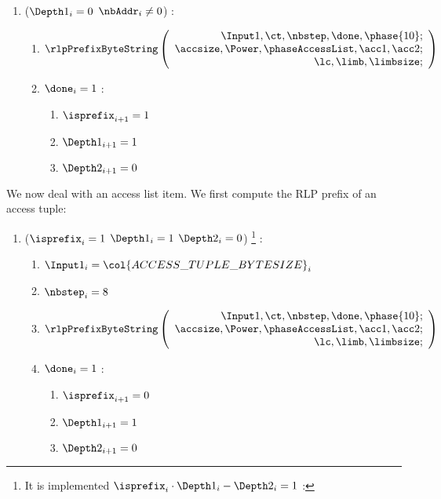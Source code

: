 \begin{enumerate}[resume]
	\item \If ($\Depth 1_{i}=0$ \et $\nbAddr_{i} \neq 0$) \Then:
	\begin{enumerate}
	    \item 
			\[
				\rlpPrefixByteString
				\left( \begin{array}{r}
					\Input1,
					\ct,
					\nbstep,
					\done,
					\phase{10}; \\
					\accsize,
					\Power,
					\phaseAccessList,
					\acc1,
					\acc2; \\
					\lc,
					\limb,
					\limbsize; \\
				\end{array} \right)
			\]
	     \item \If $\done_{i}=1$ \Then:
	     \begin{enumerate} 
		 	\item $\isprefix_{i+1}=1$
		 	\item $\Depth1_{i+1}=1$
		 	\item $\Depth2_{i+1}=0$	
	     \end{enumerate}
	\end{enumerate}
\end{enumerate}
We now deal with an access list item. We first compute the RLP prefix of an access tuple:
\begin{enumerate}[resume]
	\item \If ($\isprefix_{i}=1$ \et $\Depth1_{i}=1$ \et $\Depth2_{i}=0$) \footnote{It is implemented \If $\isprefix_{i} \cdot \Depth1_{i} - \Depth2_{i}=1$ \Then:} \Then:
	\begin{enumerate}
		\item $\Input1_{i} = \col{ACCESS\_TUPLE\_BYTESIZE}_{i}$
		\item $\nbstep_{i}=8$
		\item 
			\[
				\rlpPrefixByteString
				\left( \begin{array}{r}
					\Input1,
					\ct,
					\nbstep,
					\done,
					\phase{10}; \\
					\accsize,
					\Power,
					\phaseAccessList,
					\acc1,
					\acc2; \\
					\lc,
					\limb,
					\limbsize; \\
				\end{array} \right)
			\]
		\item \If $\done_{i}=1$ \Then:
		\begin{enumerate}
		 	\item $\isprefix_{i+1}=0$
		 	\item $\Depth1_{i+1}=1$
		 	\item $\Depth2_{i+1}=0$ 
		\end{enumerate}
	\end{enumerate}
\end{enumerate}
